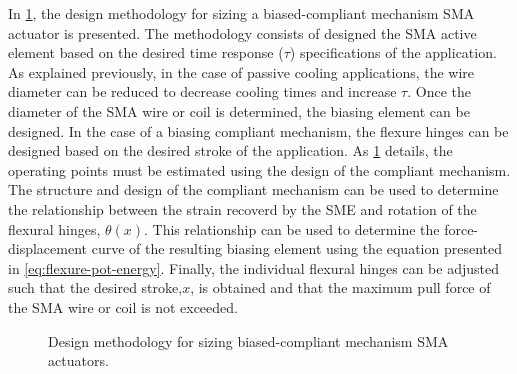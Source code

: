 In \cref{fig:flowchart-pt}, the design methodology for sizing a biased-compliant mechanism SMA actuator is presented. The methodology consists of designed the SMA active element based on the desired time response ($\tau$) specifications of the application. As explained previously, in the case of passive cooling applications, the wire diameter can be reduced to decrease cooling times and increase $\tau$. Once the diameter of the SMA wire or coil is determined, the biasing element can be designed. In the case of a biasing compliant mechanism, the flexure hinges can be designed based on the desired stroke of the application. As \cref{fig:flowchart-pt} details, the operating points must be estimated using the design of the compliant mechanism. The structure and design of the compliant mechanism can be used to determine the relationship between the strain recoverd by the SME and rotation of the flexural hinges, $\theta(x)$. This relationship can be used to determine the force-displacement curve of the resulting biasing element using the equation presented in \cref{eq:flexure-pot-energy}. Finally, the individual flexural hinges can be adjusted such that the desired stroke,$x$, is obtained and that the maximum pull force of the SMA wire or coil is not exceeded.

\begin{figure}[ht]
    \centering
    \caption{Design methodology for sizing biased-compliant mechanism SMA actuators.}
    \label{fig:flowchart-pt}
\end{figure}

